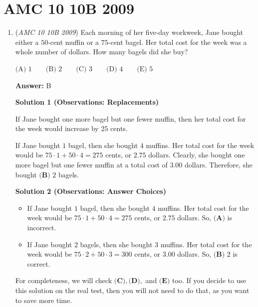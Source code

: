 \section{AMC 10 10B 2009}
        \begin{enumerate}
        	\item (\textit{AMC 10 10B 2009}) Each morning of her five-day workweek, Jane bought either a $50$-cent muffin or a $75$-cent bagel. Her total cost for the week was a whole number of dollars. How many bagels did she buy?


 $\text{(A) } 1\qquad\text{(B) } 2\qquad\text{(C) } 3\qquad\text{(D) } 4\qquad\text{(E) } 5$

 \textbf{Answer: }B



\textbf{Solution 1 (Observations: Replacements)}

If Jane bought one more bagel but one fewer muffin, then her total cost for the week would increase by $25$ cents.

 If Jane bought $1$ bagel, then she bought $4$ muffins. Her total cost for the week would be $75\cdot1+50\cdot4=275$ cents, or $2.75$ dollars. Clearly, she bought one more bagel but one fewer muffin at a total cost of $3.00$ dollars. Therefore, she bought $\boxed{\textbf{(B) } 2}$ bagels.

 



\textbf{Solution 2 (Observations: Answer Choices)}


            \begin{itemize}
        \item If Jane bought $1$ bagel, then she bought $4$ muffins. Her total cost for the week would be $75\cdot1+50\cdot4=275$ cents, or $2.75$ dollars. So, $\textbf{(A)}$ is incorrect.
            \end{itemize}
            
            \begin{itemize}
        \item If Jane bought $2$ bagels, then she bought $3$ muffins. Her total cost for the week would be $75\cdot2+50\cdot3=300$ cents, or $3.00$ dollars. So, $\boxed{\textbf{(B) } 2}$ is correct.
            \end{itemize}
            For completeness, we will check $\textbf{(C)},\textbf{(D)},$ and $\textbf{(E)}$ too. If you decide to use this solution on the real test, then you will not need to do that, as you want to save more time.


\end{enumerate}

